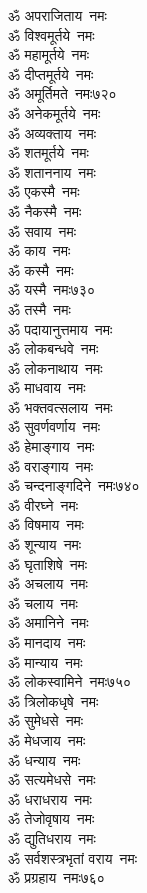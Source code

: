 \begin{multicols}{2}
\begin{flushleft}
ॐ अपराजिताय~नमः\\
ॐ विश्वमूर्तये~नमः\\
ॐ महामूर्तये~नमः\\
ॐ दीप्तमूर्तये~नमः\\
ॐ अमूर्तिमते~नमः\hfill ७२०\\
ॐ अनेकमूर्तये~नमः\\
ॐ अव्यक्ताय~नमः\\
ॐ शतमूर्तये~नमः\\
ॐ शताननाय~नमः\\
ॐ एकस्मै~नमः\\
ॐ नैकस्मै~नमः\\
ॐ सवाय~नमः\\
ॐ काय~नमः\\
ॐ कस्मै~नमः\\
ॐ यस्मै~नमः\hfill ७३०\\
ॐ तस्मै~नमः\\
ॐ पदायानुत्तमाय~नमः\\
ॐ लोकबन्धवे~नमः\\
ॐ लोकनाथाय~नमः\\
ॐ माधवाय~नमः\\
ॐ भक्तवत्सलाय~नमः\\
ॐ सुवर्णवर्णाय~नमः\\
ॐ हेमाङ्गाय~नमः\\
ॐ वराङ्गाय~नमः\\
ॐ चन्दनाङ्गदिने~नमः\hfill ७४०\\
ॐ वीरघ्ने~नमः\\
ॐ विषमाय~नमः\\
ॐ शून्याय~नमः\\
ॐ घृताशिषे~नमः\\
ॐ अचलाय~नमः\\
ॐ चलाय~नमः\\
ॐ अमानिने~नमः\\
ॐ मानदाय~नमः\\
ॐ मान्याय~नमः\\
ॐ लोकस्वामिने~नमः\hfill ७५०\\
ॐ त्रिलोकधृषे~नमः\\
ॐ सुमेधसे~नमः\\
ॐ मेधजाय~नमः\\
ॐ धन्याय~नमः\\
ॐ सत्यमेधसे~नमः\\
ॐ धराधराय~नमः\\
ॐ तेजोवृषाय~नमः\\
ॐ द्युतिधराय~नमः\\
ॐ सर्वशस्त्रभृतां वराय~नमः\\
ॐ प्रग्रहाय~नमः\hfill ७६०\\

\end{flushleft}
\end{multicols}
